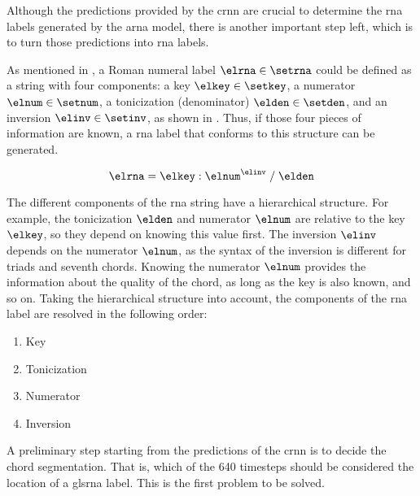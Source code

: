 
Although the predictions provided by the \gls{crnn} are
crucial to determine the \gls{rna} labels generated by the
\gls{arna} model, there is another important step left,
which is to turn those predictions into \gls{rna} labels.

As mentioned in
, a Roman
numeral label $\elrna \in \setrna$ could be defined as a
string with four components: a key $\elkey \in \setkey$, a
numerator $\elnum \in \setnum$, a tonicization (denominator)
$\elden \in \setden$, and an inversion $\elinv \in \setinv$,
as shown in . Thus, if those four pieces of
information are known, a \gls{rna} label that conforms to
this structure can be generated.

\begin{equation}
    \label{eq:rna}
    \elrna = \elkey : \elnum^{\elinv} \; / \; \elden
\end{equation}

The different components of the \gls{rna} string have a
hierarchical structure. For example, the tonicization
$\elden$ and numerator $\elnum$ are relative to the key
$\elkey$, so they depend on knowing this value first. The
inversion $\elinv$ depends on the numerator $\elnum$, as the
syntax of the inversion is different for triads and seventh
chords. Knowing the numerator $\elnum$ provides the
information about the quality of the chord, as long as the
key is also known, and so on. Taking the hierarchical
structure into account, the components of the \gls{rna}
label are resolved in the following order:

\begin{enumerate}
    \item Key 
    \item Tonicization
    \item Numerator
    \item Inversion
\end{enumerate}

A preliminary step starting from the predictions of the
\gls{crnn} is to decide the chord segmentation. That is,
which of the 640 timesteps should be considered the location
of a gls{rna} label. This is the first problem to be solved.


